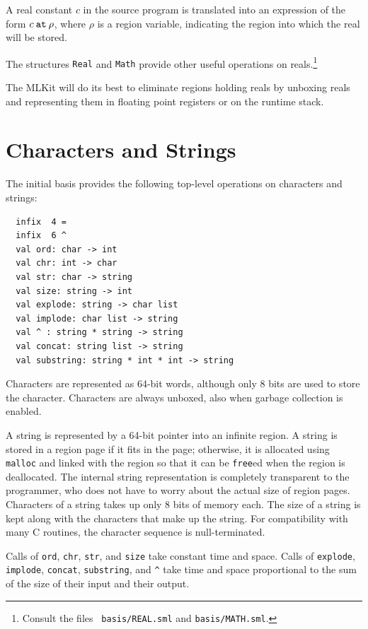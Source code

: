\documentclass[12pt]{book}
\begin{document}
A real constant $c$ in the source program is translated into an
expression of the form
%
$c\mathbin{\hbox{\tt at}}\rho$, where $\rho$ is a region variable, indicating the region
into which the real will be stored.

The structures {\tt Real} and {\tt Math} provide other useful
operations on reals.\footnote{Consult the files {\tt
    basis/REAL.sml} and {\tt basis/MATH.sml}.}

The MLKit will do its best to eliminate regions holding reals by
unboxing reals and representing them in floating point registers or on
the runtime stack.

\section{Characters and Strings}
The
%
initial basis provides the following top-level operations on characters and strings:
%
%
%
%
%
%
%
%
%
%
\begin{verbatim}
  infix  4 =
  infix  6 ^
  val ord: char -> int
  val chr: int -> char
  val str: char -> string
  val size: string -> int
  val explode: string -> char list
  val implode: char list -> string
  val ^ : string * string -> string
  val concat: string list -> string
  val substring: string * int * int -> string
\end{verbatim}
Characters are represented as 64-bit words, although only 8 bits are
used to store the character. Characters are always unboxed, also when
garbage collection is enabled.

A string is represented by a 64-bit pointer into an infinite region. A
string is stored in a region page if it fits in the page; otherwise,
it is allocated using {\tt malloc} and linked with the region so that
it can be {\tt free}ed when the region is deallocated. The internal
string representation is completely transparent to the programmer, who
does not have to worry about the actual size of region
pages. Characters of a string takes up only 8 bits of memory each. The
size of a string is kept along with the characters that make up the
string. For compatibility with many C routines, the character sequence
is null-terminated.

Calls of {\tt ord}, {\tt chr}, {\tt str}, and {\tt size} take constant
time and space.  Calls of {\tt explode}, {\tt implode}, {\tt concat},
{\tt substring}, and \verb+^+ take time and space proportional to the
sum of the size of their input and their output.
\end{document}
